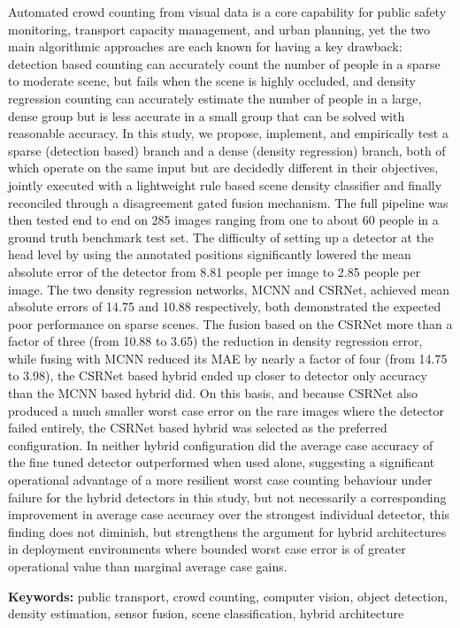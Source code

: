 \documentclass[12pt,a4paper]{report}
\begin{document}
{Automated crowd counting from visual data is a core capability for public safety monitoring, transport capacity management, and urban planning, yet the two main algorithmic approaches are each known for having a key drawback: detection based counting can accurately count the number of people in a sparse to moderate scene, but fails when the scene is highly occluded, and density regression counting can accurately estimate the number of people in a large, dense group but is less accurate in a small group that can be solved with reasonable accuracy. In this study, we propose, implement, and empirically test a sparse (detection based) branch and a dense (density regression) branch, both of which operate on the same input but are decidedly different in their objectives, jointly executed with a lightweight rule based scene density classifier and finally reconciled through a disagreement gated fusion mechanism.  The full pipeline was then tested end to end on 285 images ranging from one to about 60 people in a ground truth benchmark test set. The difficulty of setting up a detector at the head level by using the annotated positions significantly lowered the mean absolute error of the detector from 8.81 people per image to 2.85 people per image. The two density regression networks, MCNN and CSRNet, achieved mean absolute errors of 14.75 and 10.88 respectively, both demonstrated the expected poor performance on sparse scenes. The fusion based on the CSRNet more than a factor of three (from 10.88 to 3.65) the reduction in density regression error, while fusing with MCNN reduced its MAE by nearly a factor of four (from 14.75 to 3.98), the CSRNet based hybrid ended up closer to detector only accuracy than the MCNN based hybrid did. On this basis, and because CSRNet also produced a much smaller worst case error on the rare images where the detector failed entirely, the CSRNet based hybrid was selected as the preferred configuration. In neither hybrid configuration did the average case accuracy of the fine tuned detector outperformed when used alone, suggesting a significant operational advantage of a more resilient worst case counting behaviour under failure for the hybrid detectors in this study, but not necessarily a corresponding improvement in average case accuracy over the strongest individual detector, this finding does not diminish, but strengthens the argument for hybrid architectures in deployment environments where bounded worst case error is of greater operational value than marginal average case gains.

\noindent\textbf{Keywords:} public transport, crowd counting, computer vision, object detection, density estimation, sensor fusion, scene classification, hybrid architecture
}
\end{document}
